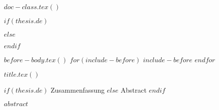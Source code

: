 $doc-class.tex()$

$if(thesis.de)$
\usepackage[english, ngerman]{babel}
$else$
\usepackage[ngerman, english]{babel}
$endif$

\usepackage[utf8]{inputenc}
\usepackage[T1]{fontenc}
\usepackage[babel]{csquotes}
\usepackage[style=alphabetic, backend=bibtex]{biblatex}
\usepackage{mathptmx}
\usepackage[scaled=0.92]{helvet}
\usepackage{courier}
\usepackage[calc]{datetime2}
\usepackage{amsmath}
\makeatletter
\def\displaymath{\typeout{*** Do not use DISPLAYMATH. Use \[...\] instead ***}}
\def\eqnarray{\typeout{*** Do not use EQNARRAY(*). Use align(*)-environment instead ***}}
\makeatother
\usepackage{amsfonts}
\usepackage{amstext}
\usepackage{color}
\usepackage{graphicx}
\usepackage{ifpdf}
\usepackage{iflang}
\usepackage{makeidx}
\usepackage{nomencl}
\usepackage{setspace}
\usepackage{lscape}
\usepackage{tabularx}
\usepackage{booktabs}
\usepackage{todonotes}
\usepackage{listings}
\usepackage[%
    binary-units=true,
    per-mode=symbol,
    exponent-product=\cdot,
    range-units=single,
    exponent-to-prefix=true,
    zero-decimal-to-integer=true,
    list-units=single
    ]{siunitx}

\usepackage[plainpages=false,pdfpagelabels]{hyperref}
\usepackage[german]{cleveref}

\def\mauve{0}
\def\graffi{1}



\ifpdf
\else   
\fi



\listfiles
\makeindex


$before-body.tex()$
$for(include-before)$
$include-before$
$endfor$

\frontmatter
$title.tex()$

\cleardoublepage

\begin{center} 
    \huge 
    $if(thesis.de)$
    Zusammenfassung
    $else$
    Abstract
    $endif$
\end{center}
$abstract$


